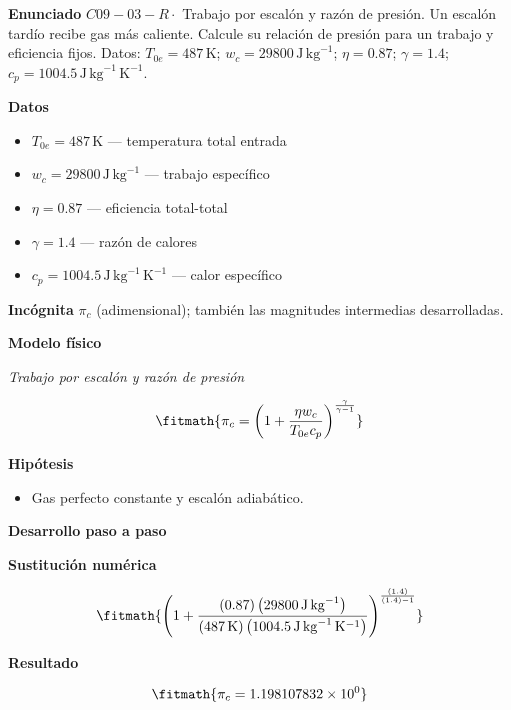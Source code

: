 \documentclass[10pt,openany]{book}
\begin{document}
\begin{tcolorbox}[title={Problema resuelto 3}, studiumworked, breakable]

\noindent\textbf{Enunciado}
\(C09-03-R \cdot\) Trabajo por escalón y razón de presión. Un escalón tardío recibe gas más caliente. Calcule su relación de presión para un trabajo y eficiencia fijos. Datos: \(T_{0e}=487\, \mathrm{K}\); \(w_c=29800\, \mathrm{J}\,\mathrm{kg}^{-1}\); \(\eta=0.87\); \(\gamma=1.4\); \(c_p=1004.5\, \mathrm{J}\,\mathrm{kg}^{-1}\,\mathrm{K}^{-1}\).

\noindent\textbf{Datos}
\begin{itemize}
\item $T_{0e} = 487\,\mathrm{K}$ — temperatura total entrada
\item $w_c = 29800\,\mathrm{J}\,\mathrm{kg}^{-1}$ — trabajo específico
\item $\eta = 0.87$ — eficiencia total-total
\item $\gamma = 1.4$ — razón de calores
\item $c_p = 1004.5\,\mathrm{J}\,\mathrm{kg}^{-1}\,\mathrm{K}^{-1}$ — calor específico
\end{itemize}

\noindent\textbf{Incógnita}
$\pi_c$ (adimensional); también las magnitudes intermedias desarrolladas.

\noindent\textbf{Modelo físico}

\noindent\textit{Trabajo por escalón y razón de presión}

\[
\fitmath{\pi_c=\left(1 + \frac{\eta w_c}{T_{0e} c_p}\right)^{\frac{\gamma}{\gamma - 1}}}
\]

\noindent\textbf{Hipótesis}
\begin{itemize}
\item Gas perfecto constante y escalón adiabático.
\end{itemize}

\noindent\textbf{Desarrollo paso a paso}



\noindent\textbf{Sustitución numérica}

\[
\fitmath{\left(1 + \frac{\left(0.87\right) \left(29800\,\mathrm{J}\,\mathrm{kg}^{-1}\right)}{\left(487\,\mathrm{K}\right) \left(1004.5\,\mathrm{J}\,\mathrm{kg}^{-1}\,\mathrm{K}^{-1}\right)}\right)^{\frac{\left(1.4\right)}{\left(1.4\right) - 1}}}
\]

\noindent\textbf{Resultado}

\[
\fitmath{\pi_c=1.198107832\times10^{0}}
\]


\end{tcolorbox}
\end{document}
